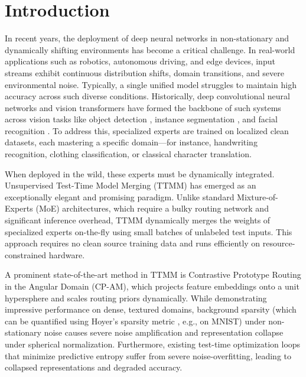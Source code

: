 \documentclass{article}
\theoremstyle{plain}
\theoremstyle{definition}
\theoremstyle{remark}
\begin{document}
\section{Introduction}
\label{sec:intro}
In recent years, the deployment of deep neural networks in non-stationary and dynamically shifting environments has become a critical challenge. In real-world applications such as robotics, autonomous driving, and edge devices, input streams exhibit continuous distribution shifts, domain transitions, and severe environmental noise. Typically, a single unified model struggles to maintain high accuracy across such diverse conditions. Historically, deep convolutional neural networks \cite{krizhevsky2012imagenet, simonyan2014very, szegedy2015going, he2016deep} and vision transformers \cite{dosovitskiy2020image} have formed the backbone of such systems across vision tasks like object detection \cite{redmon2016you}, instance segmentation \cite{he2017mask, ronneberger2015u}, and facial recognition \cite{wang2018cosface, deng2019arcface, liu2017sphereface}. To address this, specialized experts are trained on localized clean datasets, each mastering a specific domain—for instance, handwriting recognition, clothing classification, or classical character translation.

When deployed in the wild, these experts must be dynamically integrated. Unsupervised Test-Time Model Merging (TTMM) \cite{bertolissi2025local, yang2025codemerge, qiu2025mingle} has emerged as an exceptionally elegant and promising paradigm. Unlike standard Mixture-of-Experts (MoE) architectures, which require a bulky routing network and significant inference overhead, TTMM dynamically merges the weights of specialized experts on-the-fly using small batches of unlabeled test inputs. This approach requires no clean source training data and runs efficiently on resource-constrained hardware.

A prominent state-of-the-art method in TTMM is Contrastive Prototype Routing in the Angular Domain (CP-AM), which projects feature embeddings onto a unit hypersphere and scales routing priors dynamically. While demonstrating impressive performance on dense, textured domains, background sparsity (which can be quantified using Hoyer's sparsity metric \cite{hoyer2004non}, e.g., on MNIST) under non-stationary noise causes severe noise amplification and representation collapse under spherical normalization. Furthermore, existing test-time optimization loops that minimize predictive entropy suffer from severe noise-overfitting, leading to collapsed representations and degraded accuracy.
\end{document}
